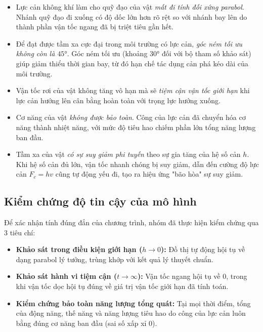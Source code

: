 \begin{itemize}
    \item Lực cản không khí làm cho quỹ đạo của vật \textit{mất đi tính đối xứng parabol}. Nhánh quỹ đạo đi xuống có độ dốc lớn hơn rõ rệt so với nhánh bay lên do thành phần vận tốc ngang đã bị triệt tiêu gần hết.
    
    \item Để đạt được tầm xa cực đại trong môi trường có lực cản, \textit{góc ném tối ưu không còn là $45°$}. Góc ném tối ưu (khoảng $30°$ đối với bộ tham số khảo sát) giúp giảm thiểu thời gian bay, từ đó hạn chế tác dụng cản phá kéo dài của môi trường.
    
    \item Vận tốc rơi của vật không tăng vô hạn mà sẽ \textit{tiệm cận vận tốc giới hạn} khi lực cản hướng lên cân bằng hoàn toàn với trọng lực hướng xuống.
    
    \item Cơ năng của vật \textit{không được bảo toàn}. Công của lực cản đã chuyển hóa cơ năng thành nhiệt năng, với mức độ tiêu hao chiếm phần lớn tổng năng lượng ban đầu.
    
    \item Tầm xa của vật \textit{có sự suy giảm phi tuyến} theo sự gia tăng của hệ số cản $h$. Khi hệ số cản đủ lớn, vận tốc nhanh chóng bị suy giảm, dẫn đến cường độ lực cản $F_c = hv$ cũng tự động yếu đi, tạo ra hiệu ứng "bão hòa" sự suy giảm.
\end{itemize}

\subsection{Kiểm chứng độ tin cậy của mô hình}
Để xác nhận tính đúng đắn của chương trình, nhóm đã thực hiện kiểm chứng qua 3 tiêu chí:
\begin{itemize}[nosep]
    \item \textbf{Khảo sát trong điều kiện giới hạn ($h \to 0$):} Đồ thị tự động hội tụ về dạng parabol lý tưởng, trùng khớp với kết quả lý thuyết chuẩn.
    \item \textbf{Khảo sát hành vi tiệm cận ($t \to \infty$):} Vận tốc ngang hội tụ về 0, trong khi vận tốc dọc hội tụ đúng về giá trị vận tốc giới hạn đã tính toán.
    \item \textbf{Kiểm chứng bảo toàn năng lượng tổng quát:} Tại mọi thời điểm, tổng của động năng, thế năng và năng lượng tiêu hao do công của lực cản luôn bằng đúng cơ năng ban đầu (sai số xấp xỉ 0).
\end{itemize}

